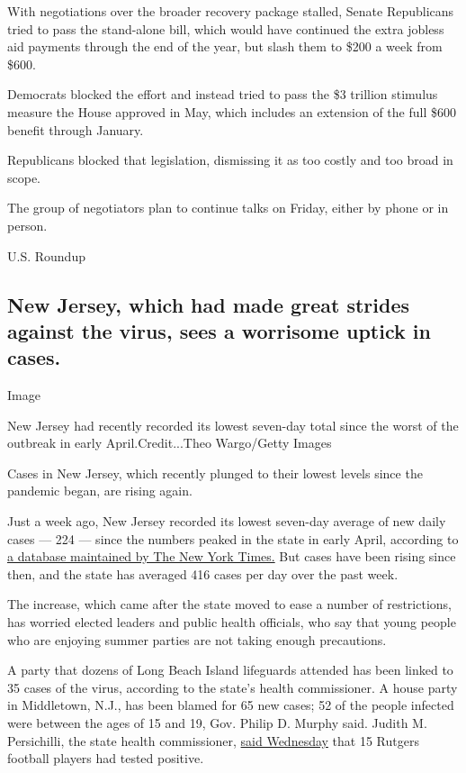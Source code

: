 With negotiations over the broader recovery package stalled, Senate
Republicans tried to pass the stand-alone bill, which would have
continued the extra jobless aid payments through the end of the year,
but slash them to \$200 a week from \$600.

Democrats blocked the effort and instead tried to pass the \$3 trillion
stimulus measure the House approved in May, which includes an extension
of the full \$600 benefit through January.

Republicans blocked that legislation, dismissing it as too costly and
too broad in scope.

The group of negotiators plan to continue talks on Friday, either by
phone or in person.

U.S. Roundup

\hypertarget{new-jersey-which-had-made-great-strides-against-the-virus-sees-a-worrisome-uptick-in-cases}{%
\subsection{New Jersey, which had made great strides against the virus,
sees a worrisome uptick in
cases.}\label{new-jersey-which-had-made-great-strides-against-the-virus-sees-a-worrisome-uptick-in-cases}}

Image

New Jersey had recently recorded its lowest seven-day total since the
worst of the outbreak in early April.Credit...Theo Wargo/Getty Images

Cases in New Jersey, which recently plunged to their lowest levels since
the pandemic began, are rising again.

Just a week ago, New Jersey recorded its lowest seven-day average of new
daily cases --- 224 --- since the numbers peaked in the state in early
April, according to
\href{https://www.nytimes3xbfgragh.onion/interactive/2020/us/new-jersey-coronavirus-cases.html}{a
database maintained by The New York Times.} But cases have been rising
since then, and the state has averaged 416 cases per day over the past
week.

The increase, which came after the state moved to ease a number of
restrictions, has worried elected leaders and public health officials,
who say that young people who are enjoying summer parties are not taking
enough precautions.

A party that dozens of Long Beach Island lifeguards attended has been
linked to 35 cases of the virus, according to the state's health
commissioner. A house party in Middletown, N.J., has been blamed for 65
new cases; 52 of the people infected were between the ages of 15 and 19,
Gov. Philip D. Murphy said. Judith M. Persichilli, the state health
commissioner, \href{https://www.youtube.com/watch?v=oqLsxnOmEAc}{said
Wednesday} that 15 Rutgers football players had tested positive.

